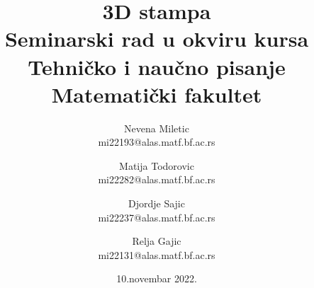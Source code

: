 \documentclass[a4paper]{article}
\begin{document}
\title{3D stampa\\ \small{Seminarski rad u okviru kursa\\Tehničko i naučno pisanje\\ Matematički fakultet}}


\author{    Nevena Miletic\\ mi22193@alas.matf.bf.ac.rs
        \and Matija Todorovic\\ mi22282@alas.matf.bf.ac.rs
        \and Djordje Sajic\\ mi22237@alas.matf.bf.ac.rs
        \and Relja Gajic\\ mi22131@alas.matf.bf.ac.rs
 }

\date{10.novembar 2022.}
\maketitle
\end{document}

